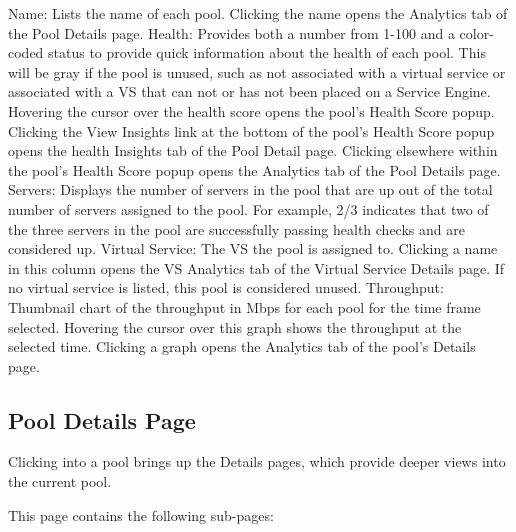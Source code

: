 \documentclass[letterpaper,10pt,english]{sphinxmanual}
\begin{document}
Name: Lists the name of each pool. Clicking the name opens the Analytics tab of the Pool Details page.
Health: Provides both a number from 1-100 and a color-coded status to provide quick information about the health of each pool. This will be gray if the pool is unused, such as not associated with a virtual service or associated with a VS that can not or has not been placed on a Service Engine.
Hovering the cursor over the health score opens the pool's Health Score popup.
Clicking the View Insights link at the bottom of the pool's Health Score popup opens the health Insights tab of the Pool Detail page.
Clicking elsewhere within the pool's Health Score popup opens the Analytics tab of the Pool Details page.
Servers: Displays the number of servers in the pool that are up out of the total number of servers assigned to the pool. For example, 2/3 indicates that two of the three servers in the pool are successfully passing health checks and are considered up.
Virtual Service: The VS the pool is assigned to. Clicking a name in this column opens the VS Analytics tab of the Virtual Service Details page. If no virtual service is listed, this pool is considered unused.
Throughput: Thumbnail chart of the throughput in Mbps for each pool for the time frame selected.
Hovering the cursor over this graph shows the throughput at the selected time.
Clicking a graph opens the Analytics tab of the pool's Details page.


\subsection{Pool Details Page}
\label{\detokenize{getting_started/pool:pool-details-page}}
Clicking into a pool brings up the Details pages, which provide deeper views into the current pool.

This page contains the following sub-pages:
\end{document}
